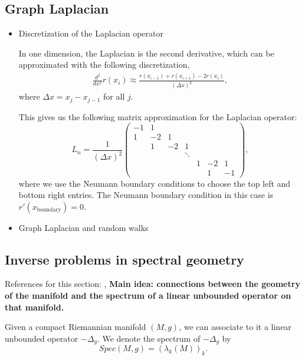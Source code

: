 \subsection{Graph Laplacian}
\begin{itemize}
    \item Discretization of the Laplacian operator
    
  In one dimension, the Laplacian is the second derivative, which can be approximated with the following discretization,
\begin{align}
    \frac{d^2}{dx^2}r(x_i) \approx \frac{r(x_{i-1}) + r(x_{i+1}) - 2 r(x_i)}{(\Delta x)^2},
\end{align}
where $\Delta x = x_j - x_{j-1}$ for all $j$.

This gives us the following matrix approximation for the Laplacian operator:
\begin{equation}
L_n = \frac{1}{(\Delta x)^2}
\begin{pmatrix}
    -1  &1  &   &   &   &   &\\
    1   &-2 &1  &   &   &   &\\
        &1  &-2 &1  &   &   &\\
        &   &   &\ddots & & &\\
        &   &   &   &1  &-2 &1\\
        &   &   &   &   &1  &-1
\end{pmatrix},
\end{equation}
where we use the Neumann boundary conditions to choose the top left and bottom right entries. The Neumann boundary condition in this case is $r'(x_{\text{boundary}}) = 0$.

\item Graph Laplacian and random walks

\end{itemize}

\subsection{Inverse problems in spectral geometry}
References for this section: \cite{lablee_spectral_2015}, \cite{kac_can_1966}
\textbf{Main idea: connections between the geometry of the manifold and the spectrum of a linear unbounded operator on that manifold. }

Given a compact Riemannian manifold $(M,g)$, we can associate to it a linear unbounded operator $-\Delta_g$. We denote the spectrum of $-\Delta_g$ by 
$$Spec(M,g) = (\lambda_k(M))_k.$$

